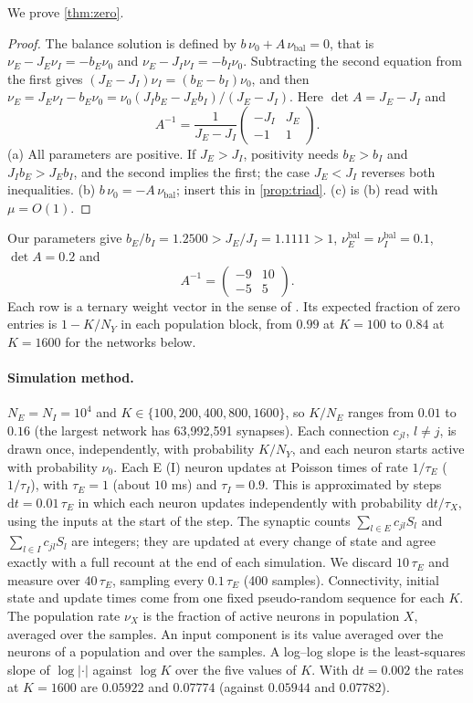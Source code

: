 \documentclass[11pt]{article}
\theoremstyle{definition}\newtheorem{definition}[theorem]{Definition}
\theoremstyle{remark}\newtheorem{remark}[theorem]{Remark}
\begin{document}
We prove \cref{thm:zero}.
\begin{proof}
The balance solution is defined by $b\,\nu_0+A\,\nu_{\mathrm{bal}}=0$, that is $\nu_E-J_E\nu_I=-b_E\nu_0$ and $\nu_E-J_I\nu_I=-b_I\nu_0$. Subtracting the second equation from the first gives $(J_E-J_I)\nu_I=(b_E-b_I)\nu_0$, and then $\nu_E=J_E\nu_I-b_E\nu_0=\nu_0(J_Ib_E-J_Eb_I)/(J_E-J_I)$. Here $\det A=J_E-J_I$ and
\[
A^{-1}=\frac1{J_E-J_I}\begin{pmatrix}-J_I&J_E\\-1&1\end{pmatrix}.
\]
(a) All parameters are positive. If $J_E>J_I$, positivity needs $b_E>b_I$ and $J_Ib_E>J_Eb_I$, and the second implies the first; the case $J_E<J_I$ reverses both inequalities. (b) $b\,\nu_0=-A\,\nu_{\mathrm{bal}}$; insert this in \cref{prop:triad}. (c) is (b) read with $\mu=O(1)$.
\end{proof}
Our parameters give $b_E/b_I=1.2500>J_E/J_I=1.1111>1$, $\nu_E^{\mathrm{bal}}=\nu_I^{\mathrm{bal}}=0.1$, $\det A=0.2$ and
\[
A^{-1}=\begin{pmatrix}-9&10\\-5&5\end{pmatrix}.
\]
Each row is a ternary weight vector in the sense of \cite{Algo}. Its expected fraction of zero entries is $1-K/N_Y$ in each population block, from $0.99$ at $K=100$ to $0.84$ at $K=1600$ for the networks below.

\paragraph{Simulation method.} $N_E=N_I=10^4$ and $K\in\{100,200,400,800,1600\}$, so $K/N_E$ ranges from $0.01$ to $0.16$ (the largest network has 63,992,591 synapses). Each connection $c_{jl}$, $l\ne j$, is drawn once, independently, with probability $K/N_Y$, and each neuron starts active with probability $\nu_0$. Each E (I) neuron updates at Poisson times of rate $1/\tau_E$ ($1/\tau_I$), with $\tau_E=1$ (about $10$ ms) and $\tau_I=0.9$. This is approximated by steps $\mathrm dt=0.01\,\tau_E$ in which each neuron updates independently with probability $\mathrm dt/\tau_X$, using the inputs at the start of the step. The synaptic counts $\sum_{l\in E}c_{jl}S_l$ and $\sum_{l\in I}c_{jl}S_l$ are integers; they are updated at every change of state and agree exactly with a full recount at the end of each simulation. We discard $10\,\tau_E$ and measure over $40\,\tau_E$, sampling every $0.1\,\tau_E$ (400 samples). Connectivity, initial state and update times come from one fixed pseudo-random sequence for each $K$. The population rate $\nu_X$ is the fraction of active neurons in population $X$, averaged over the samples. An input component is its value averaged over the neurons of a population and over the samples. A log--log slope is the least-squares slope of $\log|\cdot|$ against $\log K$ over the five values of $K$. With $\mathrm dt=0.002$ the rates at $K=1600$ are $0.05922$ and $0.07774$ (against $0.05944$ and $0.07782$).
\end{document}
